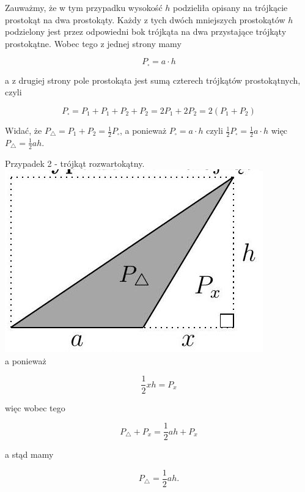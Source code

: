\documentclass[10pt]{article}
\begin{document}
Zauważmy, że w tym przypadku wysokość \(h\) podzieliła opisany na trójkącie prostokąt na dwa prostokąty. Każdy z tych dwóch mniejszych prostokątów \(h\) podzielony jest przez odpowiedni bok trójkąta na dwa przystające trójkąty prostokątne. Wobec tego z jednej strony mamy

\[
P_{\square}=a \cdot h
\]

a z drugiej strony pole prostokąta jest sumą czterech trójkątów prostokątnych, czyli

\[
P_{\square}=P_{1}+P_{1}+P_{2}+P_{2}=2 P_{1}+2 P_{2}=2\left(P_{1}+P_{2}\right)
\]

Widać, że \(P_{\triangle}=P_{1}+P_{2}=\frac{1}{2} P_{\square}\), a ponieważ \(P_{\square}=a \cdot h\) czyli \(\frac{1}{2} P_{\square}=\frac{1}{2} a \cdot h\) więc \(P_{\triangle}=\frac{1}{2} a h\).

Przypadek 2 - trójkąt rozwartokątny.\\
\includegraphics[max width=\textwidth, center]{2024_11_21_71f62bd117d375398909g-032}\\
a ponieważ

\[
\frac{1}{2} x h=P_{x}
\]

więc wobec tego

\[
P_{\triangle}+P_{x}=\frac{1}{2} a h+P_{x}
\]

a stąd mamy

\[
P_{\triangle}=\frac{1}{2} a h .
\]
\end{document}
